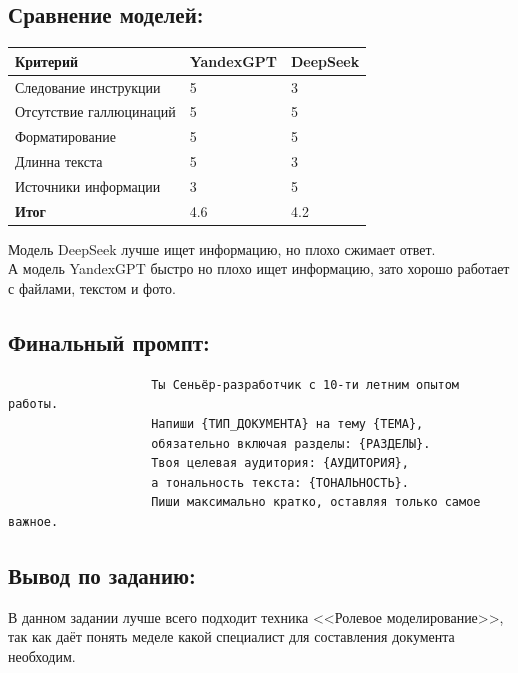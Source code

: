	\subsection{Сравнение моделей:}
	\begin{table}[h!]
		\centering
		\begin{tabular}{|l|p{5cm}|p{5cm}|}
			\hline
			\textbf{Критерий} & \textbf{YandexGPT} & \textbf{DeepSeek} \\
			\hline
			Следование инструкции & 5 & 3 \\
			\hline
			Отсутствие галлюцинаций & 5 & 5 \\
			\hline
			Форматирование & 5 & 5 \\
			\hline
			Длинна текста & 5 & 3 \\
			\hline
			Источники информации & 3 & 5 \\
			\hline
			\textbf{Итог} & 4.6 & 4.2 \\
			\hline
		\end{tabular}
	\end{table}
	Модель DeepSeek лучше ищет информацию, но плохо сжимает ответ. \\
	А модель YandexGPT быстро но плохо ищет информацию, зато хорошо работает с файлами, текстом и фото. \\

	\subsection{Финальный промпт:}
	\begin{verbatim}
					Ты Сеньёр-разработчик с 10-ти летним опытом работы.
					Напиши {ТИП_ДОКУМЕНТА} на тему {ТЕМА},
					обязательно включая разделы: {РАЗДЕЛЫ}.
					Твоя целевая аудитория: {АУДИТОРИЯ},
					а тональность текста: {ТОНАЛЬНОСТЬ}.
					Пиши максимально кратко, оставляя только самое важное.
	\end{verbatim}
	\subsection{Вывод по заданию:}
	\indent В данном задании лучше всего подходит техника <<Ролевое моделирование>>, так как даёт понять меделе какой специалист для составления документа необходим.
	